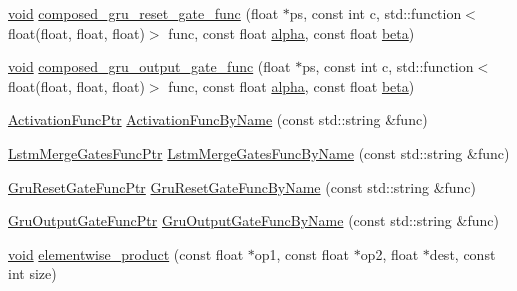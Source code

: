 \begin{DoxyCompactItemize}
\item 
\mbox{\hyperlink{mlasi_8h_a88f941d423cb2a819b70a1358982b1a6}{void}} \mbox{\hyperlink{namespaceonnxruntime_1_1rnn_1_1detail_1_1deepcpu_a26f2b2ed3d836a627d6173913d935a00}{composed\+\_\+gru\+\_\+reset\+\_\+gate\+\_\+func}} (float $\ast$ps, const int c, std\+::function$<$ float(float, float, float)$>$ func, const float \mbox{\hyperlink{mlasi_8h_a1763355f32e1812e5cb3a0080e7cca12}{alpha}}, const float \mbox{\hyperlink{mlasi_8h_a5fd37d216981b4cd9a19e29b5acd48d4}{beta}})
\item 
\mbox{\hyperlink{mlasi_8h_a88f941d423cb2a819b70a1358982b1a6}{void}} \mbox{\hyperlink{namespaceonnxruntime_1_1rnn_1_1detail_1_1deepcpu_a9725ef079492f7e405fae8e8450f44ae}{composed\+\_\+gru\+\_\+output\+\_\+gate\+\_\+func}} (float $\ast$ps, const int c, std\+::function$<$ float(float, float, float)$>$ func, const float \mbox{\hyperlink{mlasi_8h_a1763355f32e1812e5cb3a0080e7cca12}{alpha}}, const float \mbox{\hyperlink{mlasi_8h_a5fd37d216981b4cd9a19e29b5acd48d4}{beta}})
\item 
\mbox{\hyperlink{namespaceonnxruntime_1_1rnn_1_1detail_1_1deepcpu_a84524fa5e01a6b98b4bb83052910a9a6}{Activation\+Func\+Ptr}} \mbox{\hyperlink{namespaceonnxruntime_1_1rnn_1_1detail_1_1deepcpu_a6f47346831720de77ac02a76b55cbc0c}{Activation\+Func\+By\+Name}} (const std\+::string \&func)
\item 
\mbox{\hyperlink{namespaceonnxruntime_1_1rnn_1_1detail_1_1deepcpu_a4a3c3b91f46237728f04b977a7c3e5f5}{Lstm\+Merge\+Gates\+Func\+Ptr}} \mbox{\hyperlink{namespaceonnxruntime_1_1rnn_1_1detail_1_1deepcpu_a7ee3d83a8606c6343be8855fe0fa8091}{Lstm\+Merge\+Gates\+Func\+By\+Name}} (const std\+::string \&func)
\item 
\mbox{\hyperlink{namespaceonnxruntime_1_1rnn_1_1detail_1_1deepcpu_ac5be6e1baa411048d5f8baf3d4551e3c}{Gru\+Reset\+Gate\+Func\+Ptr}} \mbox{\hyperlink{namespaceonnxruntime_1_1rnn_1_1detail_1_1deepcpu_acb0ad8059b037801ea6e83d9a2b37dfc}{Gru\+Reset\+Gate\+Func\+By\+Name}} (const std\+::string \&func)
\item 
\mbox{\hyperlink{namespaceonnxruntime_1_1rnn_1_1detail_1_1deepcpu_a36e4209baa17c6f915ca2c8ea476decc}{Gru\+Output\+Gate\+Func\+Ptr}} \mbox{\hyperlink{namespaceonnxruntime_1_1rnn_1_1detail_1_1deepcpu_ac06d0cf0fd4f9c739f2358820a6ed257}{Gru\+Output\+Gate\+Func\+By\+Name}} (const std\+::string \&func)
\item 
\mbox{\hyperlink{mlasi_8h_a88f941d423cb2a819b70a1358982b1a6}{void}} \mbox{\hyperlink{namespaceonnxruntime_1_1rnn_1_1detail_1_1deepcpu_a9250a1433c8822a6593c27f1f4b867c7}{elementwise\+\_\+product}} (const float $\ast$op1, const float $\ast$op2, float $\ast$dest, const int size)

\end{DoxyCompactItemize}
